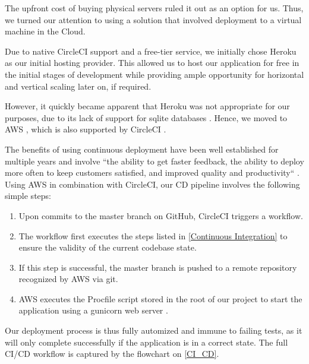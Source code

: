 \documentclass[main.tex]{subfiles}
\begin{document}
The upfront cost of buying physical servers ruled it out as an option for us. Thus, we turned our attention to using a solution that involved deployment to a virtual machine in the Cloud.

Due to native CircleCI support and a free-tier service, we initially chose Heroku \cite{Heroku} as our initial hosting provider. This allowed us to host our application for free in the initial stages of development while providing ample opportunity for horizontal and vertical scaling later on, if required.

However, it quickly became apparent that Heroku was not appropriate for our purposes, due to its lack of support for sqlite databases \cite{HerokuSqlite}. Hence, we moved to AWS \cite{AWS}, which is also supported by CircleCI \cite{AWS}.

The benefits of using continuous deployment have been well established for multiple years and involve ``the ability to get faster feedback, the ability to deploy more often to keep customers satisfied, and improved quality and productivity`` \cite{CDBenefits}. Using AWS in combination with CircleCI, our CD pipeline involves the following simple steps:

\begin{enumerate}
    \item Upon commits to the master branch on GitHub, CircleCI triggers a workflow.
    \item The workflow first executes the steps listed in \ref{Continuous Integration} to ensure the validity of the current codebase state.
    \item If this step is successful, the master branch is pushed to a remote repository recognized by AWS via git.
    \item AWS executes the Procfile script stored in the root of our project to start the application using a gunicorn web server \cite{Gunicorn}.
\end{enumerate}

Our deployment process is thus fully automized and immune to failing tests, as it will only complete successfully if the application is in a correct state. The full CI/CD workflow is captured by the flowchart on \figurename{\ref{CI_CD}}.
\end{document}
